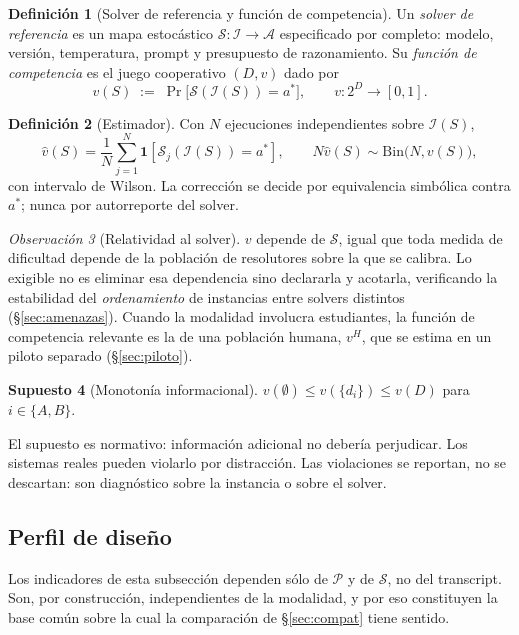 \documentclass[11pt,a4paper]{article}
\theoremstyle{definition}
\newtheorem{definicion}{Definición}[section]
\newtheorem{supuesto}[definicion]{Supuesto}
\theoremstyle{plain}
\theoremstyle{remark}
\newtheorem{observacion}[definicion]{Observación}
\newcommand{\ind}[1]{\mathbf{1}\!\left[#1\right]}
\newcommand{\solver}{\mathcal{S}}
\newcommand{\Info}{\mathcal{I}}
\begin{document}
\begin{definicion}[Solver de referencia y función de competencia]\label{def:solver}
Un \emph{solver de referencia} es un mapa estocástico
$\solver:\Info\to\mathcal{A}$ especificado por completo: modelo, versión,
temperatura, prompt y presupuesto de razonamiento. Su \emph{función de
competencia} es el juego cooperativo $(D,v)$ dado por
\[
  v(S)\;:=\;\Pr\big[\solver(\Info(S))=a^\ast\big],
  \qquad v:2^{D}\longrightarrow[0,1].
\]
\end{definicion}

\begin{definicion}[Estimador]\label{def:estimador}
Con $N$ ejecuciones independientes sobre $\Info(S)$,
\[
  \hat v(S)=\frac1N\sum_{j=1}^{N}\ind{\solver_j(\Info(S))=a^\ast},
  \qquad N\hat v(S)\sim\mathrm{Bin}\big(N,v(S)\big),
\]
con intervalo de Wilson. La corrección se decide por equivalencia simbólica contra
$a^\ast$; nunca por autorreporte del solver.
\end{definicion}

\begin{observacion}[Relatividad al solver]
$v$ depende de $\solver$, igual que toda medida de dificultad depende de la
población de resolutores sobre la que se calibra. Lo exigible no es eliminar esa
dependencia sino declararla y acotarla, verificando la estabilidad del
\emph{ordenamiento} de instancias entre solvers distintos (§\ref{sec:amenazas}).
Cuando la modalidad involucra estudiantes, la función de competencia relevante es
la de una población humana, $v^{H}$, que se estima en un piloto separado
(§\ref{sec:piloto}).
\end{observacion}

\begin{supuesto}[Monotonía informacional]\label{sup:monotonia}
$v(\emptyset)\le v(\{d_i\})\le v(D)$ para $i\in\{A,B\}$.
\end{supuesto}

El supuesto es normativo: información adicional no debería perjudicar. Los
sistemas reales pueden violarlo por distracción. Las violaciones se reportan, no
se descartan: son diagnóstico sobre la instancia o sobre el solver.

\subsection{Perfil de diseño}

Los indicadores de esta subsección dependen sólo de $\mathcal{P}$ y de $\solver$,
no del transcript. Son, por construcción, independientes de la modalidad, y por
eso constituyen la base común sobre la cual la comparación de §\ref{sec:compat}
tiene sentido.
\end{document}
